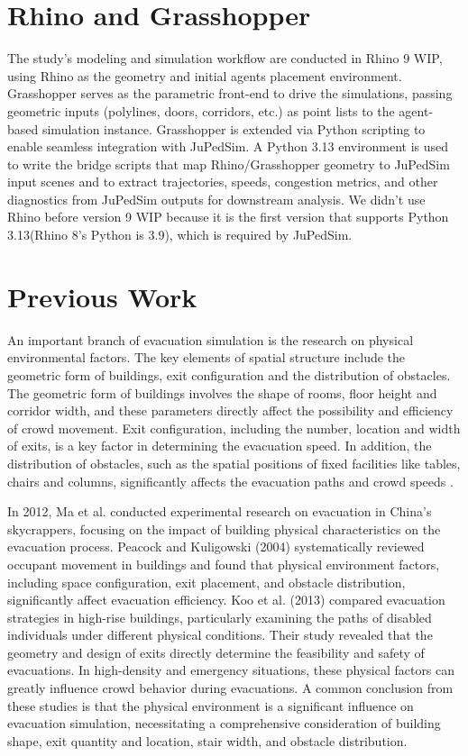 \section{Rhino and Grasshopper}
The study's modeling and simulation workflow are conducted in Rhino 9 WIP, using Rhino as the geometry and initial agents placement environment. Grasshopper serves as the parametric front-end to drive the simulations, passing geometric inputs (polylines, doors, corridors, etc.) as point lists to the agent-based simulation instance.
Grasshopper is extended via Python scripting to enable seamless integration with JuPedSim. A Python 3.13 environment is used to write the bridge scripts that map Rhino/Grasshopper geometry to JuPedSim input scenes and to extract trajectories, speeds, congestion metrics, and other diagnostics from JuPedSim outputs for downstream analysis. We didn't use Rhino before version 9 WIP because it is the first version that supports Python 3.13(Rhino 8's Python is 3.9), which is required by JuPedSim.

\section{Previous Work}
An important branch of evacuation simulation is the research on physical environmental factors. The key elements of spatial structure include the geometric form of buildings, exit configuration and the distribution of obstacles. The geometric form of buildings involves the shape of rooms, floor height and corridor width, and these parameters directly affect the possibility and efficiency of crowd movement. Exit configuration, including the number, location and width of exits, is a key factor in determining the evacuation speed. In addition, the distribution of obstacles, such as the spatial positions of fixed facilities like tables, chairs and columns, significantly affects the evacuation paths and crowd speeds .

In 2012, Ma et al. conducted experimental research on evacuation in China's skycrappers, focusing on the impact of building physical characteristics on the evacuation process. Peacock and Kuligowski (2004) systematically reviewed occupant movement in buildings and found that physical environment factors, including space configuration, exit placement, and obstacle distribution, significantly affect evacuation efficiency. Koo et al. (2013) compared evacuation strategies in high-rise buildings, particularly examining the paths of disabled individuals under different physical conditions. Their study revealed that the geometry and design of exits directly determine the feasibility and safety of evacuations. In high-density and emergency situations, these physical factors can greatly influence crowd behavior during evacuations. A common conclusion from these studies is that the physical environment is a significant influence on evacuation simulation, necessitating a comprehensive consideration of building shape, exit quantity and location, stair width, and obstacle distribution.

